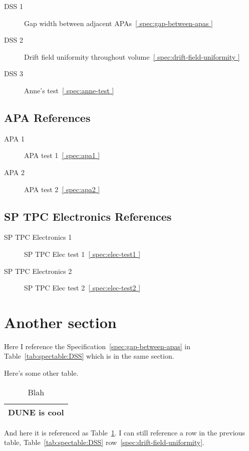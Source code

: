 \documentclass{article}
\begin{document}
\begin{description}
  
  \item[ DSS 1 ] Gap width between adjacent APAs~\ref{ spec:gap-between-apas }
  
  \item[ DSS 2 ] Drift field uniformity throughout volume~\ref{ spec:drift-field-uniformity }
  
  \item[ DSS 3 ] Anne's test~\ref{ spec:anne-test }
  
\end{description}

\subsection{APA References}

\begin{description}
  
  \item[ APA 1 ] APA test 1~\ref{ spec:apa1 }
  
  \item[ APA 2 ] APA test 2~\ref{ spec:apa2 }
  
\end{description}

\subsection{SP TPC Electronics References}

\begin{description}
  
  \item[ SP TPC Electronics 1 ] SP TPC Elec test 1~\ref{ spec:elec-test1 }
  
  \item[ SP TPC Electronics 2 ] SP TPC Elec test 2~\ref{ spec:elec-test2 }
  
\end{description}



\section{Another section}


Here I reference the Specification~\ref{spec:gap-between-apas} in Table~\ref{tab:spectable:DSS} which is in the same section.


Here's some other table.

\begin{table}[htp]
  \caption{Blah}
  \centering
  \begin{tabular}{|c|}
    \hline
    \label{row:cool} DUNE is cool \\
    \hline
  \end{tabular}
  \label{tab:cool}
\end{table}

And here it is referenced as Table~\ref{tab:cool}.  
I can still reference a row in the previous table,
Table~\ref{tab:spectable:DSS}
row~\ref{spec:drift-field-uniformity}.
\end{document}

